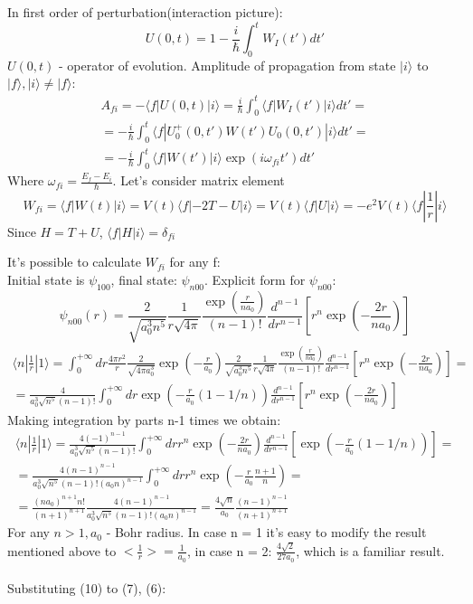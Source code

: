 \documentclass[12pt]{article}
\begin{document}
In first order of perturbation(interaction picture):
\begin{equation}
	U(0, t) = 1 - \frac{i}{\hbar}\int_0^t W_I(t')dt'
\end{equation}
$U(0, t)$ - operator of evolution. Amplitude of propagation from state $|i\rangle$ to $|f\rangle, |i\rangle \neq |f\rangle$:
\begin{eqnarray}
	A_{fi} = -\langle f|U(0, t)|i\rangle = \frac{i}{\hbar}\int_0^t \langle f|W_I(t')|i\rangle dt' =\nonumber \\= -\frac{i}{\hbar}\int_0^t \langle f|U_0 ^+(0, t')W(t')U_0 (0, t')|i\rangle dt' =  \nonumber \\=-\frac{i}{\hbar}\int_0^t \langle f|W(t')|i\rangle \exp(i\omega_{fi}t') dt'
\end{eqnarray}
Where  $\omega_{fi} = \frac{E_f - E_i}{\hbar}$.
Let's consider matrix element
\begin{equation}
W_{fi} = \langle f|W(t)|i\rangle	 = V(t)\langle f|-2T-U|i\rangle = V(t)\langle f|U|i\rangle = -e^2V(t)\langle f|\frac{1}{r}|i\rangle 
\end{equation}
Since $H = T + U$, $\langle f|H|i\rangle	 = \delta_{fi}$

It's possible to calculate $W_{fi}$ for any f:\\
Initial state is $\psi_{100}$, final state: $\psi_{n00}$.
Explicit form for $\psi_{n00}$:
\begin{equation}
	\psi_{n00}(r) = \frac{2}{\sqrt{a_0^3 n^5}} \frac{1}{r\sqrt{4\pi}} \frac{\exp(\frac{r}{na_0})}{(n-1)!} \frac{d^{n-1}}{dr^{n-1}} [r^n \exp(-\frac{2r}{na_0})]
\end{equation}
 \begin{eqnarray}
 	\langle n|\frac{1}{r}|1\rangle = \int_0 ^{+\infty} dr\frac{4\pi r^2}{r} \frac{2}{\sqrt{4\pi a_0^3}} \exp(-\frac{r}{a_0})   \frac{2}{\sqrt{a_0^3 n^5}} \frac{1}{r\sqrt{4\pi}} \frac{\exp(\frac{r}{na_0})}{(n-1)!} \frac{d^{n-1}}{dr^{n-1}}[ r^n \exp(-\frac{2r}{na_0})	] = \nonumber \\
 	=\frac{4}{a_0^3\sqrt{n^5} (n-1)!}\int_0^{+\infty}dr \exp(-\frac{r}{a_0}(1-1/n))\frac{d^{n-1}}{dr^{n-1}}[ r^n \exp(-\frac{2r}{na_0})	]
 \end{eqnarray}
	Making integration by parts n-1 times we obtain:
	\begin{eqnarray}
	\langle n|\frac{1}{r}|1\rangle = \frac{4(-1)^{n-1}}{a_0^3\sqrt{n^5} (n-1)!}\int_0^{+\infty}dr  r^n \exp(-\frac{2r}{na_0})	\frac{d^{n-1}}{dr^{n-1}}[\exp(-\frac{r}{a_0}(1-1/n))] =\nonumber \\
	= \frac{4 (n-1)^{n-1}}{a_0^3\sqrt{n^5} (n-1)! (a_0 n)^{n-1}}	\int_0^{+\infty}dr r^n \exp(-\frac{r}{a_0}\frac{n+1}{n}) = \nonumber \\
	=\frac{(na_0)^{n+1} n!}{(n+1)^{n+1}} \frac{4 (n-1)^{n-1}}{a_0^3\sqrt{n^5} (n-1)! (a_0 n)^{n-1}} = \frac{4\sqrt n}{a_0}\frac{(n-1)^{n-1}}{(n+1)^{n+1}}
	\end{eqnarray}
	For any $n>1, a_0$ - Bohr radius. In case n = 1 it's easy to modify the result mentioned above to $<\frac{1}{r}> = \frac{1}{a_0}$, in case  n = 2: $\frac{4\sqrt 2}{27a_0}$, which is a familiar result.\\ \\
	Substituting (10) to (7), (6):
	
\end{document}
